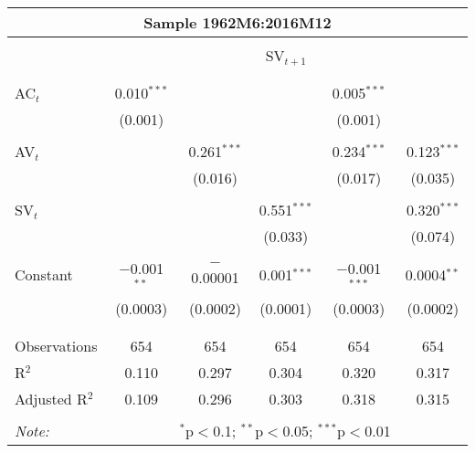 
\begin{tabular}{lccccc} 
	\multicolumn{6}{c}{Sample 1962M6:2016M12}\\
	\hline\\
& \multicolumn{5}{c}{SV$_{t+1}$} \\ 
\\[-1.8ex] 
\hline \\[-1.8ex] 
 AC$_{t}$ & 0.010$^{***}$ &  &  & 0.005$^{***}$ &  \\ 
 & (0.001) &  &  & (0.001) &  \\ 
 & & & & & \\ 
 AV$_{t}$ &  & 0.261$^{***}$ &  & 0.234$^{***}$ & 0.123$^{***}$ \\ 
 &  & (0.016) &  & (0.017) & (0.035) \\ 
 & & & & & \\ 
 SV$_{t}$ &  &  & 0.551$^{***}$ &  & 0.320$^{***}$ \\ 
 &  &  & (0.033) &  & (0.074) \\ 
 & & & & & \\ 
 Constant & $-$0.001$^{**}$ & $-$0.00001 & 0.001$^{***}$ & $-$0.001$^{***}$ & 0.0004$^{**}$ \\ 
 & (0.0003) & (0.0002) & (0.0001) & (0.0003) & (0.0002) \\ 
 & & & & & \\ 
 \hline \\[-1.8ex] 
 Observations & 654 & 654 & 654 & 654 & 654 \\ 
 R$^{2}$ & 0.110 & 0.297 & 0.304 & 0.320 & 0.317 \\ 
 Adjusted R$^{2}$ & 0.109 & 0.296 & 0.303 & 0.318 & 0.315 \\ 
\hline 
\hline \\[-1.8ex] 
\textit{Note:}  & \multicolumn{4}{r}{$^{*}$p$<$0.1; $^{**}$p$<$0.05; $^{***}$p$<$0.01} \\ 
\end{tabular} 
